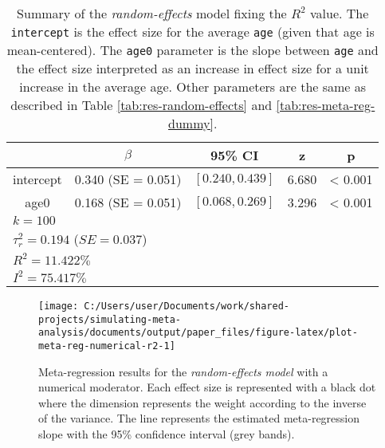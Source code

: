 \documentclass[
  man,floatsintext]{apa6}
\begin{document}
\normalsize

\scriptsize

\begin{table}[H]

\caption{\label{tab:res-meta-reg-numerical-r2}Summary of the \emph{random-effects} model fixing the \(R^{2}\) value. The \texttt{intercept} is the effect size for the average \texttt{age} (given that age is mean-centered). The \texttt{age0} parameter is the slope between \texttt{age} and the effect size interpreted as an increase in effect size for a unit increase in the average age. Other parameters are the same as described in Table \ref{tab:res-random-effects} and \ref{tab:res-meta-reg-dummy}.}
\centering
\fontsize{9}{11}\selectfont
\begin{tabular}[t]{ccccc}
\toprule
 & $\beta$ & 95\% CI & z & p\\
\midrule
intercept & 0.340 (SE = 0.051) & $[0.240, 0.439]$ & 6.680 & < 0.001\\
age0 & 0.168 (SE = 0.051) & $[0.068, 0.269]$ & 3.296 & < 0.001\\
\bottomrule
\multicolumn{5}{l}{\textsuperscript{} $k = 100$}\\
\multicolumn{5}{l}{\textsuperscript{} $\tau^2_r = 0.194$ ($SE = 0.037$)}\\
\multicolumn{5}{l}{\textsuperscript{} $R^2 = 11.422\%$}\\
\multicolumn{5}{l}{\textsuperscript{} $I^2 = 75.417\%$}\\
\end{tabular}
\end{table}

\normalsize

\scriptsize

\begin{figure}[H]

{\centering \texttt{[image: C:/Users/user/Documents/work/shared-projects/simulating-meta-analysis/documents/output/paper\_files/figure-latex/plot-meta-reg-numerical-r2-1]} 

}

\caption{Meta-regression results for the \emph{random-effects model} with a numerical moderator. Each effect size is represented with a black dot where the dimension represents the weight according to the inverse of the variance. The line represents the estimated meta-regression slope with the 95\% confidence interval (grey bands).}\label{fig:plot-meta-reg-numerical-r2}
\end{figure}
\end{document}
